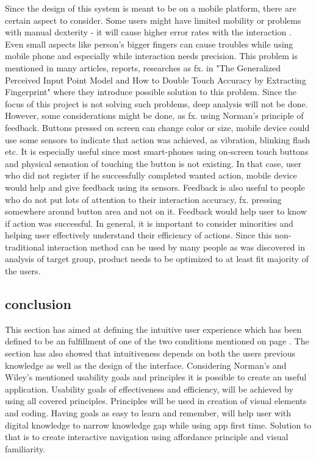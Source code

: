 Since the design of this system is meant to be on a mobile platform, there are certain aspect to consider. Some users might have limited mobility or problems with manual dexterity - it will cause higher error rates with the interaction \cite{Wileys}. Even small aspects like person's bigger fingers can cause troubles while using mobile phone and especially while interaction needs precision. This problem is mentioned in many articles, reports, researches as fx. in "The Generalized Perceived Input Point Model and How to Double Touch Accuracy by Extracting Fingerprint" where they introduce possible solution to this problem. Since the focus of this project is not solving such problems, deep analysis will not be done. However, some considerations might be done, as fx. using Norman's principle of feedback. Buttons pressed on screen can change color or size, mobile device could use some sensors to indicate that action was achieved, as vibration, blinking flash etc. It is especially useful since most smart-phones using on-screen touch buttons and physical sensation of touching the button is not existing.  In that case, user who did not register if he successfully completed wanted action, mobile device would help and give feedback using its sensors. Feedback is also useful to people who do not put lots of attention to their interaction accuracy, fx. pressing somewhere around button area and not on it. Feedback would help user to know if action was successful. 
In general, it is important to consider minorities and helping user effectively understand their efficiency of actions. Since this non-traditional interaction method can be used by many people as was discovered in analysis of target group, product needs to be optimized to at least fit majority of the users. 

\subsection{conclusion}
This section has aimed at defining the intuitive user experience which has been defined to be an fulfillment of one of the two conditions mentioned on page \pageref{intuitiveConditions}. The section has also showed that intuitiveness depends on both the users previous knowledge as well as the design of the interface. Considering Norman's and Wiley's mentioned usability goals and principles it is 
possible to create an useful application. Usability goals of effectiveness and 
efficiency, will be achieved by using all covered principles. Principles will be 
used in creation of visual elements and coding. Having goals as easy to learn and 
remember, will help user with digital knowledge to narrow knowledge gap while 
using app first time. Solution to that is to create interactive navigation using 
affordance principle and visual familiarity.
